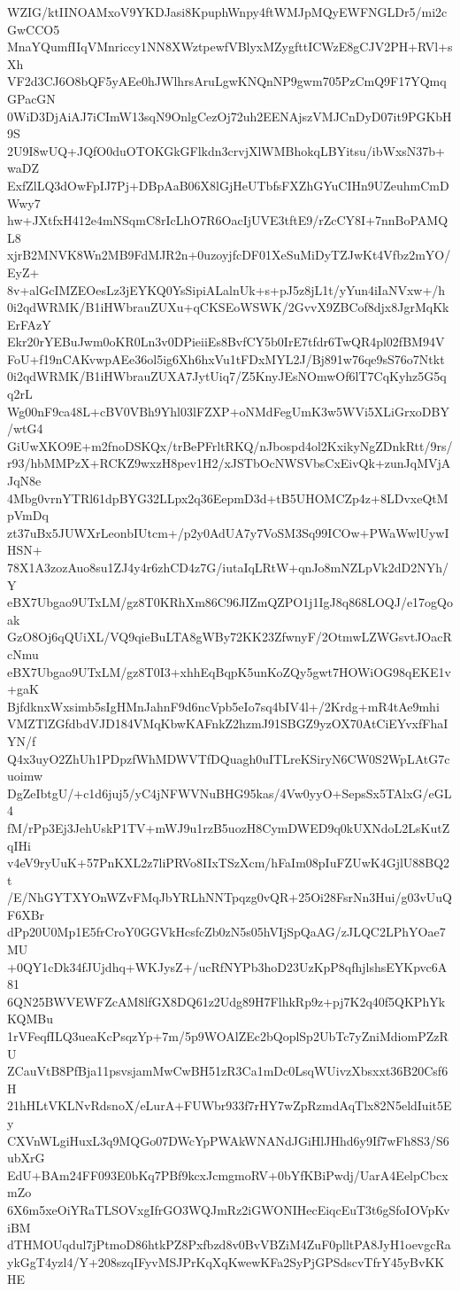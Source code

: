 WZIG/ktIINOAMxoV9YKDJasi8KpuphWnpy4ftWMJpMQyEWFNGLDr5/mi2cGwCCO5
MnaYQumfIIqVMnriccy1NN8XWztpewfVBlyxMZygfttICWzE8gCJV2PH+RVl+sXh
VF2d3CJ6O8bQF5yAEe0hJWlhrsAruLgwKNQnNP9gwm705PzCmQ9F17YQmqGPacGN
0WiD3DjAiAJ7iCImW13sqN9OnlgCezOj72uh2EENAjszVMJCnDyD07it9PGKbH9S
2U9I8wUQ+JQfO0duOTOKGkGFlkdn3crvjXlWMBhokqLBYitsu/ibWxsN37b+waDZ
ExfZlLQ3dOwFpIJ7Pj+DBpAaB06X8lGjHeUTbfsFXZhGYuCIHn9UZeuhmCmDWwy7
hw+JXtfxH412e4mNSqmC8rIcLhO7R6OacIjUVE3tftE9/rZcCY8I+7nnBoPAMQL8
xjrB2MNVK8Wn2MB9FdMJR2n+0uzoyjfcDF01XeSuMiDyTZJwKt4Vfbz2mYO/EyZ+
8v+alGcIMZEOesLz3jEYKQ0YsSipiALalnUk+s+pJ5z8jL1t/yYun4iIaNVxw+/h
0i2qdWRMK/B1iHWbrauZUXu+qCKSEoWSWK/2GvvX9ZBCof8djx8JgrMqKkErFAzY
Ekr20rYEBuJwm0oKR0Ln3v0DPieiiEs8BvfCY5b0IrE7tfdr6TwQR4pl02fBM94V
FoU+f19nCAKvwpAEe36ol5ig6Xh6hxVu1tFDxMYL2J/Bj891w76qe9sS76o7Ntkt
0i2qdWRMK/B1iHWbrauZUXA7JytUiq7/Z5KnyJEsNOmwOf6lT7CqKyhz5G5qq2rL
Wg00nF9ca48L+cBV0VBh9Yhl03lFZXP+oNMdFegUmK3w5WVi5XLiGrxoDBY/wtG4
GiUwXKO9E+m2fnoDSKQx/trBePFrltRKQ/nJbospd4ol2KxikyNgZDnkRtt/9rs/
r93/hbMMPzX+RCKZ9wxzH8pev1H2/xJSTbOcNWSVbsCxEivQk+zunJqMVjAJqN8e
4Mbg0vrnYTRl61dpBYG32LLpx2q36EepmD3d+tB5UHOMCZp4z+8LDvxeQtMpVmDq
zt37uBx5JUWXrLeonbIUtcm+/p2y0AdUA7y7VoSM3Sq99ICOw+PWaWwlUywIHSN+
78X1A3zozAuo8su1ZJ4y4r6zhCD4z7G/iutaIqLRtW+qnJo8mNZLpVk2dD2NYh/Y
eBX7Ubgao9UTxLM/gz8T0KRhXm86C96JIZmQZPO1j1IgJ8q868LOQJ/e17ogQoak
GzO8Oj6qQUiXL/VQ9qieBuLTA8gWBy72KK23ZfwnyF/2OtmwLZWGsvtJOacRcNmu
eBX7Ubgao9UTxLM/gz8T0I3+xhhEqBqpK5unKoZQy5gwt7HOWiOG98qEKE1v+gaK
BjfdknxWxsimb5sIgHMnJahnF9d6ncVpb5eIo7sq4bIV4l+/2Krdg+mR4tAe9mhi
VMZTlZGfdbdVJD184VMqKbwKAFnkZ2hzmJ91SBGZ9yzOX70AtCiEYvxfFhaIYN/f
Q4x3uyO2ZhUh1PDpzfWhMDWVTfDQuagh0uITLreKSiryN6CW0S2WpLAtG7cuoimw
DgZeIbtgU/+c1d6juj5/yC4jNFWVNuBHG95kas/4Vw0yyO+SepsSx5TAlxG/eGL4
fM/rPp3Ej3JehUskP1TV+mWJ9u1rzB5uozH8CymDWED9q0kUXNdoL2LsKutZqIHi
v4eV9ryUuK+57PnKXL2z7liPRVo8IIxTSzXcm/hFaIm08pIuFZUwK4GjlU88BQ2t
/E/NhGYTXYOnWZvFMqJbYRLhNNTpqzg0vQR+25Oi28FsrNn3Hui/g03vUuQF6XBr
dPp20U0Mp1E5frCroY0GGVkHcsfcZb0zN5s05hVIjSpQaAG/zJLQC2LPhYOae7MU
+0QY1cDk34fJUjdhq+WKJysZ+/ucRfNYPb3hoD23UzKpP8qfhjlshsEYKpvc6A81
6QN25BWVEWFZcAM8lfGX8DQ61z2Udg89H7FlhkRp9z+pj7K2q40f5QKPhYkKQMBu
1rVFeqfILQ3ueaKcPsqzYp+7m/5p9WOAlZEc2bQoplSp2UbTc7yZniMdiomPZzRU
ZCauVtB8PfBja11psvsjamMwCwBH51zR3Ca1mDc0LsqWUivzXbsxxt36B20Csf6H
21hHLtVKLNvRdsnoX/eLurA+FUWbr933f7rHY7wZpRzmdAqTlx82N5eldIuit5Ey
CXVnWLgiHuxL3q9MQGo07DWcYpPWAkWNANdJGiHlJHhd6y9If7wFh8S3/S6ubXrG
EdU+BAm24FF093E0bKq7PBf9kcxJcmgmoRV+0bYfKBiPwdj/UarA4EelpCbcxmZo
6X6m5xeOiYRaTLSOVxgIfrGO3WQJmRz2iGWONIHecEiqcEuT3t6gSfoIOVpKviBM
dTHMOUqdul7jPtmoD86htkPZ8Pxfbzd8v0BvVBZiM4ZuF0plltPA8JyH1oevgcRa
ykGgT4yzl4/Y+208szqIFyvMSJPrKqXqKwewKFa2SyPjGPSdscvTfrY45yBvKKHE

